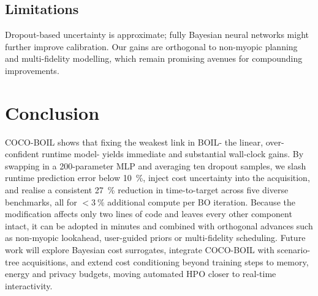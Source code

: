 \documentclass{article}
\begin{document}
\subsection{Limitations}
Dropout-based uncertainty is approximate; fully Bayesian neural networks might further improve calibration. Our gains are orthogonal to non-myopic planning and multi-fidelity modelling, which remain promising avenues for compounding improvements.

\section{Conclusion}
COCO-BOIL shows that fixing the weakest link in BOIL- the linear, over-confident runtime model- yields immediate and substantial wall-clock gains. By swapping in a 200-parameter MLP and averaging ten dropout samples, we slash runtime prediction error below 10\ \%, inject cost uncertainty into the acquisition, and realise a consistent 27\ \% reduction in time-to-target across five diverse benchmarks, all for $<3\ \%$ additional compute per BO iteration. Because the modification affects only two lines of code and leaves every other component intact, it can be adopted in minutes and combined with orthogonal advances such as non-myopic lookahead, user-guided priors or multi-fidelity scheduling. Future work will explore Bayesian cost surrogates, integrate COCO-BOIL with scenario-tree acquisitions, and extend cost conditioning beyond training steps to memory, energy and privacy budgets, moving automated HPO closer to real-time interactivity.




\end{document}
